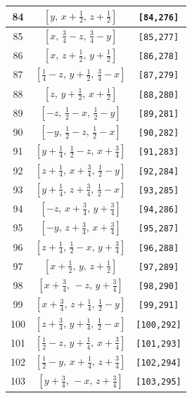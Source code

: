\documentclass[fleqn,8pt]{jsarticle}
\begin{document}
\begin{longtable}{ccc}
84 & $\left[ y,\, x + \frac{1}{2},\, z + \frac{1}{2} \right]$ & {\tt [84,276]} \\ \hline
85 & $\left[ x,\, \frac{3}{4} - z,\, \frac{3}{4} - y \right]$ & {\tt [85,277]} \\ \hline
86 & $\left[ x,\, z + \frac{1}{2},\, y + \frac{1}{2} \right]$ & {\tt [86,278]} \\ \hline
87 & $\left[ \frac{1}{4} - z,\, y + \frac{1}{2},\, \frac{3}{4} - x \right]$ & {\tt [87,279]} \\ \hline
88 & $\left[ z,\, y + \frac{1}{2},\, x + \frac{1}{2} \right]$ & {\tt [88,280]} \\ \hline
89 & $\left[ - z,\, \frac{1}{2} - x,\, \frac{1}{2} - y \right]$ & {\tt [89,281]} \\ \hline
90 & $\left[ - y,\, \frac{1}{2} - z,\, \frac{1}{2} - x \right]$ & {\tt [90,282]} \\ \hline
91 & $\left[ y + \frac{1}{4},\, \frac{1}{2} - z,\, x + \frac{3}{4} \right]$ & {\tt [91,283]} \\ \hline
92 & $\left[ z + \frac{1}{4},\, x + \frac{3}{4},\, \frac{1}{2} - y \right]$ & {\tt [92,284]} \\ \hline
93 & $\left[ y + \frac{1}{4},\, z + \frac{3}{4},\, \frac{1}{2} - x \right]$ & {\tt [93,285]} \\ \hline
94 & $\left[ - z,\, x + \frac{3}{4},\, y + \frac{3}{4} \right]$ & {\tt [94,286]} \\ \hline
95 & $\left[ - y,\, z + \frac{3}{4},\, x + \frac{3}{4} \right]$ & {\tt [95,287]} \\ \hline
96 & $\left[ z + \frac{1}{4},\, \frac{1}{2} - x,\, y + \frac{3}{4} \right]$ & {\tt [96,288]} \\ \hline
97 & $\left[ x + \frac{1}{2},\, y,\, z + \frac{1}{2} \right]$ & {\tt [97,289]} \\ \hline
98 & $\left[ x + \frac{3}{4},\, - z,\, y + \frac{3}{4} \right]$ & {\tt [98,290]} \\ \hline
99 & $\left[ x + \frac{3}{4},\, z + \frac{1}{4},\, \frac{1}{2} - y \right]$ & {\tt [99,291]} \\ \hline
100 & $\left[ z + \frac{3}{4},\, y + \frac{1}{4},\, \frac{1}{2} - x \right]$ & {\tt [100,292]} \\ \hline
101 & $\left[ \frac{1}{2} - z,\, y + \frac{1}{4},\, x + \frac{3}{4} \right]$ & {\tt [101,293]} \\ \hline
102 & $\left[ \frac{1}{2} - y,\, x + \frac{1}{4},\, z + \frac{3}{4} \right]$ & {\tt [102,294]} \\ \hline
103 & $\left[ y + \frac{3}{4},\, - x,\, z + \frac{3}{4} \right]$ & {\tt [103,295]} \\ \hline

\end{longtable}
\end{document}
